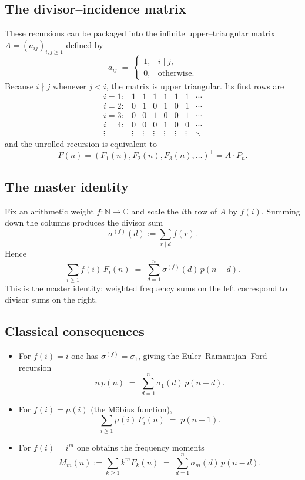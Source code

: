 \documentclass[11pt]{article}
\theoremstyle{definition}
\theoremstyle{remark}
\begin{document}
\subsection{The divisor--incidence matrix}

These recursions can be packaged into the infinite upper--triangular matrix
$A=(a_{ij})_{i,j\ge1}$ defined by
\[
  a_{ij} \;=\;
  \begin{cases}
    1, & i\mid j,\\
    0, & \text{otherwise}.
  \end{cases}
\]
Because $i\nmid j$ whenever $j<i$, the matrix is upper triangular. Its first
rows are
\[
  \begin{array}{cccccccc}
  i=1: & 1 & 1 & 1 & 1 & 1 & 1 & \cdots \\
  i=2: & 0 & 1 & 0 & 1 & 0 & 1 & \cdots \\
  i=3: & 0 & 0 & 1 & 0 & 0 & 1 & \cdots \\
  i=4: & 0 & 0 & 0 & 1 & 0 & 0 & \cdots \\
  \vdots & \vdots & \vdots & \vdots & \vdots & \vdots & \vdots & \ddots
  \end{array}
\]
and the unrolled recursion is equivalent to
\[
  F(n)=(F_1(n),F_2(n),F_3(n),\ldots)^{\mathsf T}=A\cdot P_n.
\]

\subsection{The master identity}

Fix an arithmetic weight $f:\mathbb N\to\mathbb C$ and scale the $i$th row of
$A$ by $f(i)$. Summing down the columns produces the divisor sum
\[
  \sigma^{(f)}(d) := \sum_{r\mid d} f(r).
\]
Hence
\[
  \sum_{i\ge1} f(i)\,F_i(n) \;=\; \sum_{d=1}^n \sigma^{(f)}(d)\,p(n-d).
\]
This is the master identity: weighted frequency sums on the left correspond to
divisor sums on the right.

\subsection{Classical consequences}

\begin{itemize}
  \item For $f(i)=i$ one has $\sigma^{(f)}=\sigma_1$, giving the Euler--Ramanujan--Ford
  recursion
  \[
    n\,p(n) \;=\; \sum_{d=1}^n \sigma_1(d)\,p(n-d).
  \]

  \item For $f(i)=\mu(i)$ (the Möbius function),
  \[
    \sum_{i\ge1} \mu(i)\,F_i(n) \;=\; p(n-1).
  \]

  \item For $f(i)=i^m$ one obtains the frequency moments
  \[
    M_m(n) := \sum_{k\ge1} k^m F_k(n) \;=\; \sum_{d=1}^n \sigma_m(d)\,p(n-d).
  \]
\end{itemize}
\end{document}
